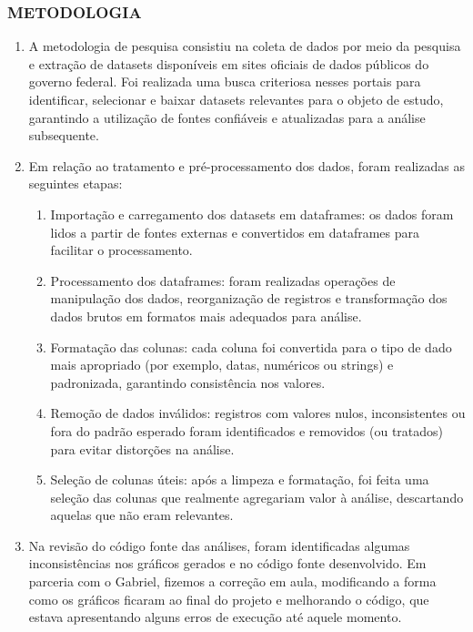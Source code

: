 \documentclass{article}
\begin{document}
\subsubsection{METODOLOGIA}
\begin{enumerate}
    \item A metodologia de pesquisa consistiu na coleta de dados por meio da pesquisa e extração de datasets disponíveis em sites oficiais de dados públicos do governo federal. Foi realizada uma busca criteriosa nesses portais para identificar, selecionar e baixar datasets relevantes para o objeto de estudo, garantindo a utilização de fontes confiáveis e atualizadas para a análise subsequente.
    \item Em relação ao tratamento e pré-processamento dos dados, foram realizadas as seguintes etapas:
        \begin{enumerate}
            \item Importação e carregamento dos datasets em dataframes: os dados foram lidos a partir de fontes externas e convertidos em dataframes para facilitar o processamento.
            \item Processamento dos dataframes: foram realizadas operações de manipulação dos dados, reorganização de registros e transformação dos dados brutos em formatos mais adequados para análise.
            \item Formatação das colunas: cada coluna foi convertida para o tipo de dado mais apropriado (por exemplo, datas, numéricos ou strings) e padronizada, garantindo consistência nos valores.
            \item Remoção de dados inválidos: registros com valores nulos, inconsistentes ou fora do padrão esperado foram identificados e removidos (ou tratados) para evitar distorções na análise.
            \item Seleção de colunas úteis: após a limpeza e formatação, foi feita uma seleção das colunas que realmente agregariam valor à análise, descartando aquelas que não eram relevantes.
        \end{enumerate}
    \item Na revisão do código fonte das análises, foram identificadas algumas inconsistências nos gráficos gerados e no código fonte desenvolvido. Em parceria com o Gabriel, fizemos a correção em aula, modificando a forma como os gráficos ficaram ao final do projeto e melhorando o código, que estava apresentando alguns erros de execução até aquele momento.
\end{enumerate}
\end{document}
